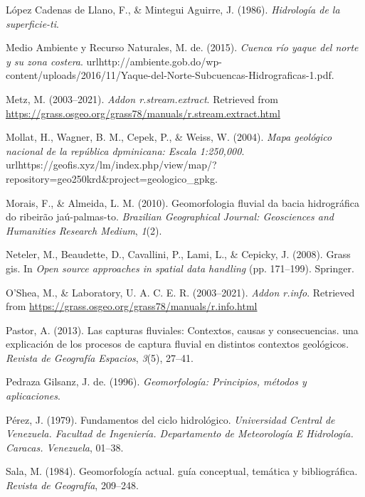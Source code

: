 \documentclass[11pt,]{article}
\begin{document}
\hypertarget{ref-lopez1986hidrologia}{}
López Cadenas de Llano, F., \& Mintegui Aguirre, J. (1986).
\emph{Hidrología de la superficie-ti}.

\hypertarget{ref-Mmar2015cuenca}{}
Medio Ambiente y Recurso Naturales, M. de. (2015). \emph{Cuenca río
yaque del norte y su zona costera}.
urlhttp://ambiente.gob.do/wp-content/uploads/2016/11/Yaque-del-Norte-Subcuencas-Hidrograficas-1.pdf.

\hypertarget{ref-streamnextractmarkus}{}
Metz, M. (2003--2021). \emph{Addon r.stream.extract}. Retrieved from
\url{https://grass.osgeo.org/grass78/manuals/r.stream.extract.html}

\hypertarget{ref-Mollat2004mapa}{}
Mollat, H., Wagner, B. M., Cepek, P., \& Weiss, W. (2004). \emph{Mapa
geológico nacional de la república dpminicana: Escala 1:250,000}.
urlhttps://geofis.xyz/lm/index.php/view/map/?repository=geo250krd\&project=geologico\_gpkg.

\hypertarget{ref-morais2010geomorfologia}{}
Morais, F., \& Almeida, L. M. (2010). Geomorfologia fluvial da bacia
hidrográfica do ribeirão jaú-palmas-to. \emph{Brazilian Geographical
Journal: Geosciences and Humanities Research Medium}, \emph{1}(2).

\hypertarget{ref-neteler2008grass}{}
Neteler, M., Beaudette, D., Cavallini, P., Lami, L., \& Cepicky, J.
(2008). Grass gis. In \emph{Open source approaches in spatial data
handling} (pp. 171--199). Springer.

\hypertarget{ref-rinfo}{}
O'Shea, M., \& Laboratory, U. A. C. E. R. (2003--2021). \emph{Addon
r.info}. Retrieved from
\url{https://grass.osgeo.org/grass78/manuals/r.info.html}

\hypertarget{ref-pastor2013capturas}{}
Pastor, A. (2013). Las capturas fluviales: Contextos, causas y
consecuencias. una explicación de los procesos de captura fluvial en
distintos contextos geológicos. \emph{Revista de Geografía Espacios},
\emph{3}(5), 27--41.

\hypertarget{ref-pedraza1996geomorfologia}{}
Pedraza Gilsanz, J. de. (1996). \emph{Geomorfología: Principios, métodos
y aplicaciones}.

\hypertarget{ref-perez1979fundamentos}{}
Pérez, J. (1979). Fundamentos del ciclo hidrológico. \emph{Universidad
Central de Venezuela. Facultad de Ingeniería. Departamento de
Meteorología E Hidrología. Caracas. Venezuela}, 01--38.

\hypertarget{ref-sala1984geomorfologia}{}
Sala, M. (1984). Geomorfología actual. guía conceptual, temática y
bibliográfica. \emph{Revista de Geografía}, 209--248.
\end{document}
